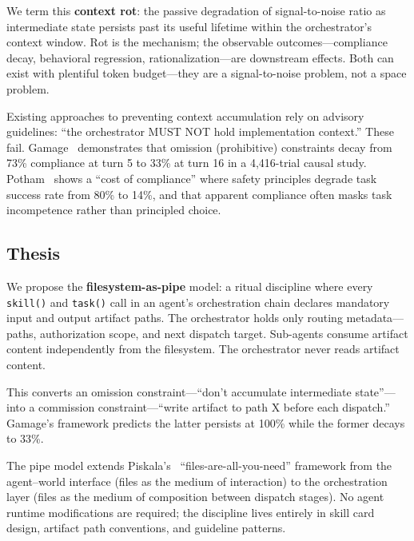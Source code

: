 \documentclass[11pt,a4paper]{article}
\begin{document}
We term this \textbf{context rot}: the passive degradation of signal-to-noise ratio as intermediate state persists past its useful lifetime within the orchestrator's context window. Rot is the mechanism; the observable outcomes---compliance decay, behavioral regression, rationalization---are downstream effects. Both can exist with plentiful token budget---they are a signal-to-noise problem, not a space problem.

Existing approaches to preventing context accumulation rely on advisory guidelines: ``the orchestrator MUST NOT hold implementation context.'' These fail. Gamage~\cite{gamage2026} demonstrates that omission (prohibitive) constraints decay from 73\% compliance at turn 5 to 33\% at turn 16 in a 4,416-trial causal study. Potham~\cite{potham2025} shows a ``cost of compliance'' where safety principles degrade task success rate from 80\% to 14\%, and that apparent compliance often masks task incompetence rather than principled choice.

\subsection{Thesis}
We propose the \textbf{filesystem-as-pipe} model: a ritual discipline where every \texttt{skill()} and \texttt{task()} call in an agent's orchestration chain declares mandatory input and output artifact paths. The orchestrator holds only routing metadata---paths, authorization scope, and next dispatch target. Sub-agents consume artifact content independently from the filesystem. The orchestrator never reads artifact content.

This converts an omission constraint---``don't accumulate intermediate state''---into a commission constraint---``write artifact to path X before each dispatch.'' Gamage's framework predicts the latter persists at 100\% while the former decays to 33\%.

The pipe model extends Piskala's~\cite{piskala2026} ``files-are-all-you-need'' framework from the agent--world interface (files as the medium of interaction) to the orchestration layer (files as the medium of composition between dispatch stages). No agent runtime modifications are required; the discipline lives entirely in skill card design, artifact path conventions, and guideline patterns.
\end{document}
